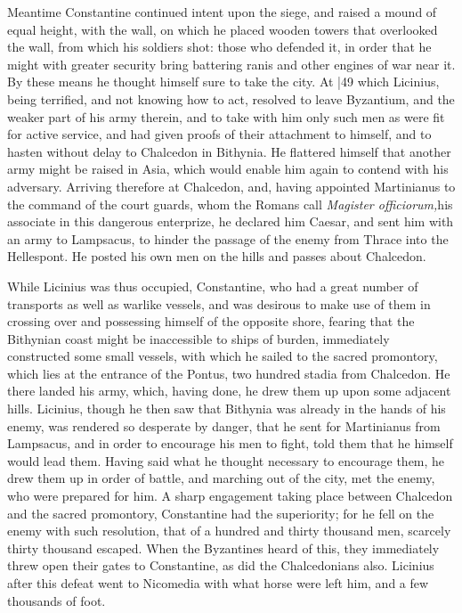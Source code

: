 Meantime Constantine continued intent upon the siege, and raised a mound of equal height, with the wall, on which he placed wooden towers that overlooked the wall, from which his soldiers shot: those who defended it, in order that he might with greater security bring battering ranis and other engines of war near it. By these means he thought himself sure to take the city.
At |49 which Licinius, being terrified, and not knowing how to act, resolved to leave Byzantium, and the weaker part of his army therein, and to take with him only such men as were fit for active service, and had given proofs of their attachment to himself, and to hasten without delay to Chalcedon in Bithynia. He flattered himself that another army might be raised in Asia, which would enable him again to contend with his adversary. Arriving therefore at Chalcedon, and, having appointed Martinianus to the command of the court guards, whom the Romans call \emph{Magister officiorum,}his associate in this dangerous enterprize, he declared him Caesar,
and sent him with an army to Lampsacus, to hinder the passage of the enemy from Thrace into the Hellespont. He posted his own men on the hills and passes about
Chalcedon.

While Licinius was thus occupied, Constantine, who had a great number of transports as well as warlike vessels, and was desirous to make use of them in crossing over and possessing himself of the opposite shore, fearing that the Bithynian coast might be inaccessible to ships of burden, immediately constructed some small vessels, with which he sailed to the sacred promontory, which lies at the entrance of the Pontus, two hundred stadia from Chalcedon. He there landed his army, which, having done, he drew them up upon some adjacent hills. Licinius, though he then saw that Bithynia was already in the hands of his enemy, was rendered so desperate by danger, that he sent for Martinianus from Lampsacus, and in order to encourage his men to fight, told them that he himself would lead them. Having said what he thought necessary to encourage them, he drew them up
in order of battle, and marching out of the city, met the enemy, who were prepared for him. A sharp engagement taking place between Chalcedon and the sacred promontory, Constantine had the superiority; for he fell on the enemy with such resolution, that of a hundred and thirty thousand men, scarcely thirty thousand escaped. When the Byzantines heard of this, they immediately threw open their gates to Constantine, as did the Chalcedonians also. Licinius after this defeat went to Nicomedia with what horse were left him, and a few thousands of foot.

